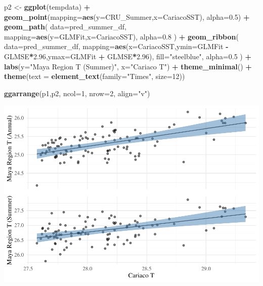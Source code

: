 \documentclass[]{article}
\newenvironment{Shaded}{\begin{snugshade}}{\end{snugshade}}
\newcommand{\KeywordTok}[1]{\textcolor[rgb]{0.13,0.29,0.53}{\textbf{#1}}}
\newcommand{\DataTypeTok}[1]{\textcolor[rgb]{0.13,0.29,0.53}{#1}}
\newcommand{\DecValTok}[1]{\textcolor[rgb]{0.00,0.00,0.81}{#1}}
\newcommand{\FloatTok}[1]{\textcolor[rgb]{0.00,0.00,0.81}{#1}}
\newcommand{\StringTok}[1]{\textcolor[rgb]{0.31,0.60,0.02}{#1}}
\newcommand{\OperatorTok}[1]{\textcolor[rgb]{0.81,0.36,0.00}{\textbf{#1}}}
\newcommand{\NormalTok}[1]{#1}
\begin{document}
\begin{Shaded}
\begin{Highlighting}[]
\NormalTok{p2 <-}\StringTok{ }\KeywordTok{ggplot}\NormalTok{(tempdata) }\OperatorTok{+}
\StringTok{    }\KeywordTok{geom_point}\NormalTok{(}\DataTypeTok{mapping=}\KeywordTok{aes}\NormalTok{(}\DataTypeTok{y=}\NormalTok{CRU_Summer,}\DataTypeTok{x=}\NormalTok{CariacoSST),}
        \DataTypeTok{alpha=}\FloatTok{0.5}\NormalTok{) }\OperatorTok{+}
\StringTok{    }\KeywordTok{geom_path}\NormalTok{(}
        \DataTypeTok{data=}\NormalTok{pred_summer_df,}
        \DataTypeTok{mapping=}\KeywordTok{aes}\NormalTok{(}\DataTypeTok{y=}\NormalTok{GLMFit,}\DataTypeTok{x=}\NormalTok{CariacoSST),}
        \DataTypeTok{alpha=}\FloatTok{0.8}
\NormalTok{        ) }\OperatorTok{+}
\StringTok{    }\KeywordTok{geom_ribbon}\NormalTok{(}
        \DataTypeTok{data=}\NormalTok{pred_summer_df,}
        \DataTypeTok{mapping=}\KeywordTok{aes}\NormalTok{(}\DataTypeTok{x=}\NormalTok{CariacoSST,}\DataTypeTok{ymin=}\NormalTok{GLMFit }\OperatorTok{-}\StringTok{ }\NormalTok{GLMSE}\OperatorTok{*}\FloatTok{2.96}\NormalTok{,}\DataTypeTok{ymax=}\NormalTok{GLMFit }\OperatorTok{+}\StringTok{ }\NormalTok{GLMSE}\OperatorTok{*}\FloatTok{2.96}\NormalTok{),}
        \DataTypeTok{fill=}\StringTok{"steelblue"}\NormalTok{,}
        \DataTypeTok{alpha=}\FloatTok{0.5}
\NormalTok{        ) }\OperatorTok{+}
\StringTok{    }\KeywordTok{labs}\NormalTok{(}\DataTypeTok{y=}\StringTok{"Maya Region T (Summer)"}\NormalTok{, }\DataTypeTok{x=}\StringTok{"Cariaco T"}\NormalTok{) }\OperatorTok{+}
\StringTok{    }\KeywordTok{theme_minimal}\NormalTok{() }\OperatorTok{+}
\StringTok{    }\KeywordTok{theme}\NormalTok{(}\DataTypeTok{text =} \KeywordTok{element_text}\NormalTok{(}\DataTypeTok{family=}\StringTok{"Times"}\NormalTok{, }\DataTypeTok{size=}\DecValTok{12}\NormalTok{))}

\KeywordTok{ggarrange}\NormalTok{(p1,p2,}
    \DataTypeTok{ncol=}\DecValTok{1}\NormalTok{,}
    \DataTypeTok{nrow=}\DecValTok{2}\NormalTok{,}
    \DataTypeTok{align=}\StringTok{"v"}\NormalTok{)}
\end{Highlighting}
\end{Shaded}

\includegraphics{cru_data_files/figure-latex/unnamed-chunk-10-1.pdf}
\end{document}
